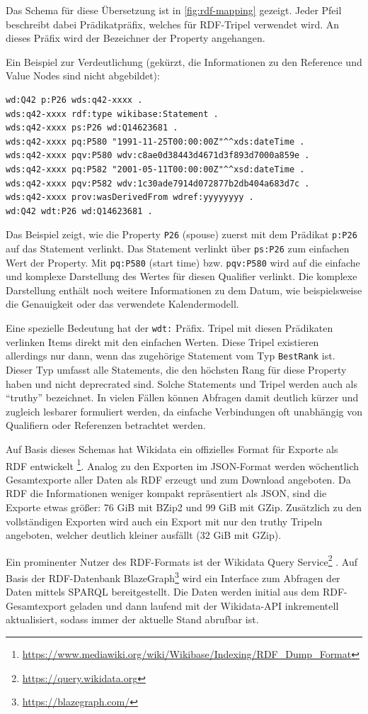 Das Schema für diese Übersetzung ist in \cref{fig:rdf-mapping} gezeigt.
Jeder Pfeil beschreibt dabei Prädikatpräfix, welches für RDF-Tripel verwendet wird.
An dieses Präfix wird der Bezeichner der Property angehangen.

Ein Beispiel zur Verdeutlichung (gekürzt, die Informationen zu den Reference und Value Nodes sind nicht abgebildet):
\begin{lstlisting}[language=SPARQL]
wd:Q42 p:P26 wds:q42-xxxx .
wds:q42-xxxx rdf:type wikibase:Statement .
wds:q42-xxxx ps:P26 wd:Q14623681 .
wds:q42-xxxx pq:P580 "1991-11-25T00:00:00Z"^^xds:dateTime .
wds:q42-xxxx pqv:P580 wdv:c8ae0d38443d4671d3f893d7000a859e .
wds:q42-xxxx pq:P582 "2001-05-11T00:00:00Z"^^xsd:dateTime .
wds:q42-xxxx pqv:P582 wdv:1c30ade7914d072877b2db404a683d7c .
wds:q42-xxxx prov:wasDerivedFrom wdref:yyyyyyyy .
wd:Q42 wdt:P26 wd:Q14623681 .
\end{lstlisting}
Das Beispiel zeigt, wie die Property \verb|P26| (spouse) zuerst mit dem Prädikat \verb|p:P26| auf das Statement verlinkt.
Das Statement verlinkt über \verb|ps:P26| zum einfachen Wert der Property.
Mit \verb|pq:P580| (start time) bzw. \verb|pqv:P580| wird auf die einfache und komplexe Darstellung des Wertes für diesen Qualifier verlinkt.
Die komplexe Darstellung enthält noch weitere Informationen zu dem Datum, wie beispielsweise die Genauigkeit oder das verwendete Kalendermodell.

Eine spezielle Bedeutung hat der \verb|wdt:| Präfix.
Tripel mit diesen Prädikaten verlinken Items direkt mit den einfachen Werten.
Diese Tripel existieren allerdings nur dann, wenn das zugehörige Statement vom Typ \verb|BestRank| ist.
Dieser Typ umfasst alle Statements, die den höchsten Rang für diese Property haben und nicht deprecrated sind.
Solche Statements und Tripel werden auch als "`truthy"' bezeichnet.
In vielen Fällen können Abfragen damit deutlich kürzer und zugleich lesbarer formuliert werden, da einfache Verbindungen oft unabhängig von Qualifiern oder Referenzen betrachtet werden.

Auf Basis dieses Schemas hat Wikidata ein offizielles Format für Exporte als RDF entwickelt \footnote{\url{https://www.mediawiki.org/wiki/Wikibase/Indexing/RDF_Dump_Format}}.
Analog zu den Exporten im JSON-Format werden wöchentlich Gesamtexporte aller Daten als RDF erzeugt und zum Download angeboten.
Da RDF die Informationen weniger kompakt repräsentiert als JSON, sind die Exporte etwas größer: 76 GiB mit BZip2 und 99 GiB mit GZip.
Zusätzlich zu den vollständigen Exporten wird auch ein Export mit nur den truthy Tripeln angeboten, welcher deutlich kleiner ausfällt (32 GiB mit GZip).

Ein prominenter Nutzer des RDF-Formats ist der Wikidata Query Service\footnote{\url{https://query.wikidata.org}} \cite{wd-sparql}.
Auf Basis der RDF-Datenbank BlazeGraph\footnote{\url{https://blazegraph.com/}} wird ein Interface zum Abfragen der Daten mittels SPARQL bereitgestellt.
Die Daten werden initial aus dem RDF-Gesamtexport geladen und dann laufend mit der Wikidata-API inkrementell aktualisiert, sodass immer der aktuelle Stand abrufbar ist.